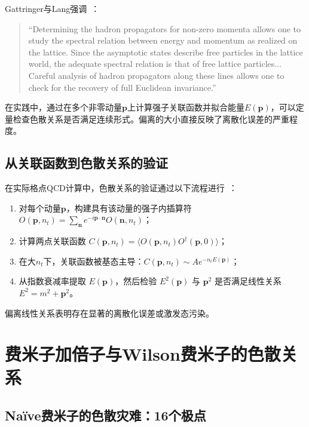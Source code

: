 \documentclass[12pt,a4paper]{ctexart}
\theoremstyle{definition}
\begin{document}
Gattringer与Lang强调~\cite{GattringerLang2010}：
\begin{quote}
``Determining the hadron propagators for non-zero momenta allows one to study the spectral relation between energy and momentum as realized on the lattice. Since the asymptotic states describe free particles in the lattice world, the adequate spectral relation is that of free lattice particles... Careful analysis of hadron propagators along these lines allows one to check for the recovery of full Euclidean invariance.''
\end{quote}

在实践中，通过在多个非零动量$\mathbf{p}$上计算强子关联函数并拟合能量$E(\mathbf{p})$，可以定量检查色散关系是否满足连续形式。偏离的大小直接反映了离散化误差的严重程度。

\subsection{从关联函数到色散关系的验证}

在实际格点QCD计算中，色散关系的验证通过以下流程进行~\cite{hadronSpectroscopy2026}：

\begin{enumerate}[leftmargin=*]
    \item 对每个动量$\mathbf{p}$，构建具有该动量的强子内插算符 $O(\mathbf{p}, n_t) = \sum_{\mathbf{n}} e^{-i\mathbf{p}\cdot\mathbf{n}} O(\mathbf{n}, n_t)$；
    \item 计算两点关联函数 $C(\mathbf{p}, n_t) = \langle O(\mathbf{p}, n_t) O^\dagger(\mathbf{p}, 0) \rangle$；
    \item 在大$n_t$下，关联函数被基态主导：$C(\mathbf{p}, n_t) \sim A e^{-n_t E(\mathbf{p})}$；
    \item 从指数衰减率提取 $E(\mathbf{p})$，然后检验 $E^2(\mathbf{p})$ 与 $\mathbf{p}^2$ 是否满足线性关系 $E^2 = m^2 + \mathbf{p}^2$。
\end{enumerate}

偏离线性关系表明存在显著的离散化误差或激发态污染。

\section{费米子加倍子与Wilson费米子的色散关系}

\subsection{Na\"ive费米子的色散灾难：16个极点}
\end{document}
